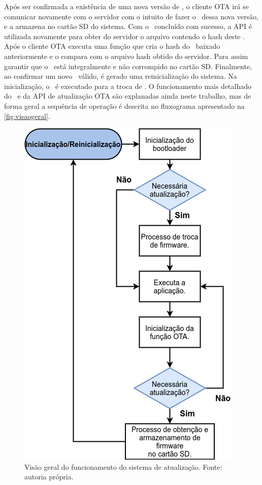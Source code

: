 Após ser confirmada a existência de uma nova versão de \firmware, o cliente OTA irá se comunicar novamente com o servidor com o intuito de fazer o \download\ dessa nova versão, e a armazena no cartão SD do sistema. Com o \download\ concluído com sucesso, a API é utilizada novamente para obter do servidor o arquivo contendo o hash deste \firmware. Após o cliente OTA executa uma função que cria o hash do \firmware\ baixado anteriormente e o compara com o arquivo hash obtido do servidor. Para assim garantir que o \firmware\ está integralmente e não corrompido no cartão SD. Finalmente, ao confirmar um novo \firmware\ válido, é gerado uma reinicialização do sistema. Na inicialização, o \bootloader\ é executado para a troca de \firmware. O funcionamento mais detalhado do \bootloader\ e da API de atualização OTA são explanadas ainda neste trabalho, mas de forma geral a sequência de operação é descrita no fluxograma apresentado na \autoref{fig:visaogeral}.

\begin{figure}[H]
    \scriptsize
     \centering
     \includegraphics[scale=0.7]{dados/figuras/FuncionamentoGeral.png}
     \caption{Visão geral do funcionamento do sistema de atualização. \newline Fonte: autoria própria.}
     \label{fig:visaogeral}
\end{figure}

